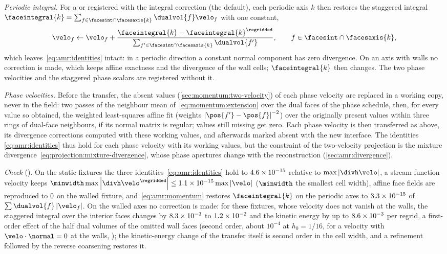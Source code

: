 \emph{Periodic integral.} For a  or 
registered with the integral correction (the default), each periodic axis $k$
then restores the staggered integral
$\faceintegral{k}=\sum_{f\in\facesint\cap\facesaxis{k}}\dualvol{f}\velo_f$
with one constant,
\begin{equation}\label{eq:amr:momentum}
  \velo_f\leftarrow\velo_f+\frac{\faceintegral{k}-\faceintegral{k}^{\regridded}}{\sum_{f'\in\facesint\cap\facesaxis{k}}\dualvol{f'}},
  \qquad f\in\facesint\cap\facesaxis{k},
\end{equation}
which leaves~\cref{eq:amr:identities} intact: in a periodic direction a
constant normal component has zero divergence. On an axis with walls no
correction is made, which keeps affine exactness and the divergence of the
wall cells; $\faceintegral{k}$ then changes. The two phase velocities and the
staggered phase scalars are registered without it.

\emph{Phase velocities.} Before the transfer, the absent values
(\cref{sec:momentum:two-velocity}) of each phase velocity are replaced in a
working copy, never in the field: two passes of the neighbour mean
of~\cref{eq:momentum:extension} over the dual faces of the phase schedule,
then, for every value so obtained, the weighted least-squares affine fit
(weights $\abs{\pos{f'}-\pos{f}}^{-2}$) over the originally present values
within three rings of dual-face neighbours, if its normal matrix is
regular; values still missing get zero. Each phase velocity is then
transferred as above, its divergence corrections computed with these working
values, and afterwards marked absent with the new interface. The identities
\cref{eq:amr:identities} thus hold for each phase velocity with its working
values, but the constraint of the two-velocity projection is the mixture
divergence~\cref{eq:projection:mixture-divergence}, whose phase apertures
change with the reconstruction (\cref{sec:amr:divergence}).

\emph{Check} (). On the static fixtures
the three identities~\cref{eq:amr:identities} hold to $4.6\times10^{-15}$
relative to $\max\abs{\divh\velo}$, a stream-function velocity keeps
$\minwidth\max\abs{\divh\velo^{\regridded}}\le\chkAmrSolenoidal\max\abs{\velo}$
($\minwidth$ the smallest cell width),
affine face fields are reproduced to $0$ on the walled fixture,
and~\cref{eq:amr:momentum} restores $\faceintegral{k}$ on the periodic axes to
$3.3\times10^{-15}$ of $\sum\dualvol{f}\abs{\velo_f}$. On the walled axes
no correction is made: for these fixtures, whose velocity does not vanish at
the walls, the staggered integral over the interior faces changes by
$8.3\times10^{-3}$ to $1.2\times10^{-2}$ and the kinetic energy by up
to $8.6\times10^{-3}$ per regrid, a first-order effect of the half dual volumes of
the omitted wall faces (second order, about $10^{-4}$ at $h_0=1/16$, for a
velocity with $\velo\cdot\normal=0$ at the walls,
); the kinetic-energy change of the
transfer itself is second order in the cell width, and a refinement followed
by the reverse coarsening restores it.


